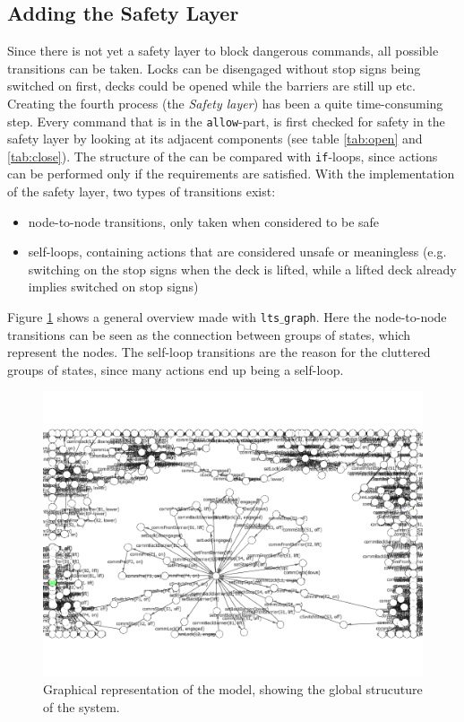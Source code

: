 \subsection{Adding the Safety Layer}
\label{sec:safety}
Since there is not yet a safety layer to block dangerous commands, all possible transitions can be taken. Locks can be disengaged without stop signs being switched on first, decks could be opened while the barriers are still up etc. Creating the fourth process (the \emph{Safety layer}) has been a quite time-consuming step. Every command that is in the \texttt{allow}-part, is first checked for safety in the safety layer by looking at its adjacent components (see table \ref{tab:open} and \ref{tab:close}). The structure of the can be compared with \texttt{if}-loops, since actions can be performed only if the requirements are satisfied. With the implementation of the safety layer, two types of transitions exist:
%
\begin{itemize}
	\item node-to-node transitions, only taken when considered to be safe
	\item self-loops, containing actions that are considered unsafe or meaningless (e.g. switching on the stop signs when the deck is lifted, while a lifted deck already implies switched on stop signs)
\end{itemize}
%
Figure \ref{fig:global} shows a general overview made with \texttt{lts$\_$graph}. Here the node-to-node transitions can be seen as the connection between groups of states, which represent the nodes. The self-loop transitions are the reason for the cluttered groups of states, since many actions end up being a self-loop.
%
\begin{figure}[htb]
\centering
\includegraphics[width=\columnwidth]{Images/detail_graph.png}
\caption{Graphical representation of the model, showing the global strucuture of the system.}%
\label{fig:global}
\end{figure}%
%
